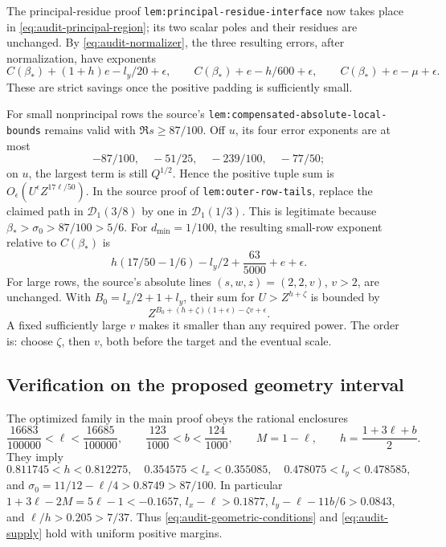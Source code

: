 \documentclass[11pt,a4paper]{article}
\numberwithin{equation}{section}
\theoremstyle{remark}
\begin{document}
The principal-residue proof \texttt{lem:principal-residue-interface}
now takes place in \eqref{eq:audit-principal-region}; its two scalar
poles and their residues are unchanged.  By \eqref{eq:audit-normalizer},
the three resulting errors, after normalization, have exponents
\[
 C(\beta_*)+(1+h)e-l_y/20+\epsilon,\qquad
 C(\beta_*)+e-h/600+\epsilon,\qquad
 C(\beta_*)+e-\mu+\epsilon.
\]
These are strict savings once the positive padding is sufficiently small.

For small nonprincipal rows the source's
\texttt{lem:compensated-absolute-local-bounds} remains valid with
\(\Re s\ge87/100\).  Off \(u\), its four error exponents are at most
\[
 -87/100,\quad -51/25,\quad -239/100,\quad -77/50;
\]
on \(u\), the largest term is
still \(Q^{1/2}\).  Hence the positive tuple sum is
\(O_\epsilon(U^\epsilon Z^{17\ell/50})\).
In the source proof of \texttt{lem:outer-row-tails}, replace the claimed
path in \(\mathcal D_1(3/8)\) by one in \(\mathcal D_1(1/3)\).
This is legitimate because \(\beta_*>\sigma_0>87/100>5/6\).
For \(d_{\min}=1/100\), the resulting small-row exponent relative to
\(C(\beta_*)\) is
\begin{equation}
 h(17/50-1/6)-l_y/2+\frac{63}{5000}+e+\epsilon.
 \label{eq:audit-small}
\end{equation}
For large rows, the source's absolute lines \((s,w,z)=(2,2,v)\),
\(v>2\), are unchanged.  With \(B_0=l_x/2+1+l_y\), their sum for
\(U>Z^{h+\zeta}\) is bounded by
\[
 Z^{B_0+(h+\zeta)(1+\epsilon)-\zeta v+\epsilon}.
\]
A fixed sufficiently large \(v\) makes it smaller than any required
power.  The order is: choose \(\zeta\), then \(v\), both before the
target and the eventual scale.

\subsection{Verification on the proposed geometry interval}

The optimized family in the main proof obeys the rational enclosures
\[
 \frac{16683}{100000}<\ell<\frac{16685}{100000},\qquad
 \frac{123}{1000}<b<\frac{124}{1000},\qquad
 M=1-\ell,\qquad h=\frac{1+3\ell+b}{2}.
\]
They imply
\[
 0.811745<h<0.812275,\quad
 0.354575<l_x<0.355085,\quad
 0.478075<l_y<0.478585,
\]
and \(\sigma_0=11/12-\ell/4>0.8749>87/100\).
In particular \(1+3\ell-2M=5\ell-1<-0.1657\),
\(l_x-\ell>0.1877\),
\(l_y-\ell-11b/6>0.0843\), and
\(\ell/h>0.205>7/37\).  Thus
\eqref{eq:audit-geometric-conditions} and
\eqref{eq:audit-supply} hold with uniform positive margins.
\end{document}
